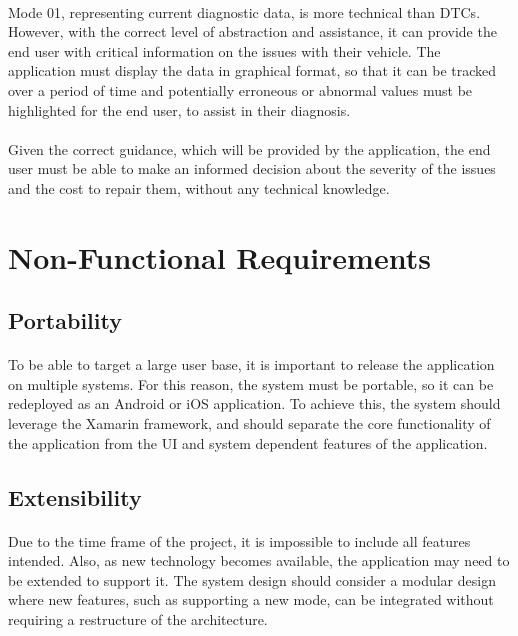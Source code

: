	\paragraph{}{
	Mode 01, representing current diagnostic data, is more technical than DTCs. However, with the correct level of abstraction and assistance, it can provide the end user with critical information on the issues with their vehicle. The application must display the data in graphical format, so that it can be tracked over a period of time and potentially erroneous or abnormal values must be highlighted for the end user, to assist in their diagnosis.
	}
	\paragraph{}{
	Given the correct guidance, which will be provided by the application, the end user must be able to make an informed decision about the severity of the issues and the cost to repair them, without any technical knowledge.
	}

\section{Non-Functional Requirements}
	\subsection{Portability}
		\paragraph{}{
		To be able to target a large user base, it is important to release the application on multiple systems. For this reason, the system must be portable, so it can be redeployed as an Android or iOS application. To achieve this, the system should leverage the Xamarin framework, and should separate the core functionality of the application from the UI and system dependent features of the application.
		}
	\subsection{Extensibility}
		\paragraph{}{
		Due to the time frame of the project, it is impossible to include all features intended. Also, as new technology becomes available, the application may need to be extended to support it. The system design should consider a modular design where new features, such as supporting a new mode, can be integrated without requiring a restructure of the architecture.
		}
